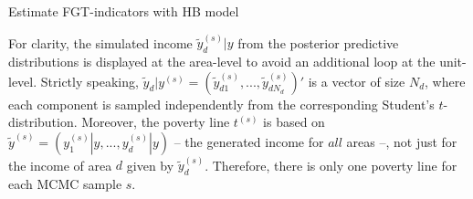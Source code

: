 \begin{algorithm}
    \caption{Estimate FGT-indicators with HB model}

\end{algorithm}


For clarity, the simulated income $\tilde y_d^{(s)}|y$ from the posterior predictive distributions is displayed at the area-level to avoid an additional loop at the unit-level.
Strictly speaking, $\tilde y_d|y^{(s)} = (\tilde y_{d1}^{(s)}, ..., \tilde y_{dN_d}^{(s)})'$ is a vector of size $N_d$, where each component is sampled independently from the corresponding Student's $t$-distribution.
Moreover, the poverty line $t^{(s)}$ is based on $\tilde y^{(s)} = (y^{(s)}_1|y, ..., y^{(s)}_d|y)$ – the generated income for $all$ areas –, not just for the income of area $d$ given by $\tilde y_d^{(s)}$. Therefore, there is only one poverty line for each MCMC sample $s$.

